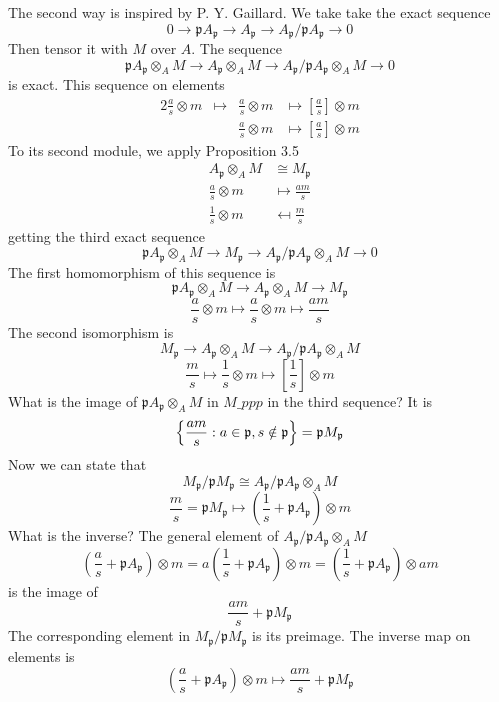 \documentclass{article}
\newcommand{\mf}{\mathfrak}
\newcommand{\ppp}{\mf p}
\begin{document}
The second way is inspired by P. Y. Gaillard.
We take take the exact sequence
\[
0 \rightarrow \ppp A_\ppp \rightarrow A_\ppp \rightarrow A_\ppp/\ppp A_\ppp \rightarrow 0
\]
Then tensor it with $M$ over $A$. The sequence
\[
\ppp A_\ppp \otimes_A M \rightarrow A_\ppp \otimes_A M \rightarrow A_\ppp / \ppp A_\ppp \otimes_A M \rightarrow 0
\]
is exact. This sequence on elements
\begin{alignat*}{2}
\frac{a}{s} \otimes m 
  & \mapsto  
  & \frac{a}{s} \otimes m 
  & \mapsto 
    \left[ \frac{a}{s} \right] \otimes m \\
&& \frac{a}{s} \otimes m  
  & \mapsto 
    \left[ \frac{a}{s} \right] \otimes m
\end{alignat*}
To its second module, we apply Proposition 3.5
\begin{align*}
A_\ppp \otimes_A M & \cong M_\ppp \\
\frac{a}{s} \otimes m & \mapsto \frac{am}{s} \\
\frac{1}{s} \otimes m & \mapsfrom \frac{m}{s}
\end{align*}
getting the third exact sequence
\[
\ppp A_\ppp \otimes_A M \rightarrow M_\ppp \rightarrow A_\ppp / \ppp A_\ppp \otimes_A M \rightarrow 0
\]
The first homomorphism of this sequence is
\[
\ppp A_\ppp \otimes_A M \rightarrow A_\ppp \otimes_A M \rightarrow M_\ppp
\]
\[
\frac{a}{s}\otimes m \mapsto \frac{a}{s}\otimes m \mapsto \frac{am}{s} 
\]
The second isomorphism is
\[
M_\ppp \rightarrow A_\ppp \otimes_A M \rightarrow A_\ppp/\ppp A_\ppp \otimes_A M
\]
\[
\frac{m}{s} \mapsto \frac{1}{s} \otimes m \mapsto \left[ \frac{1}{s} \right] \otimes m
\]
What is the image of $\ppp A_\ppp \otimes_A M$ in $M\_ppp$ in the third sequence? It is
\[
\Bigl\{ \frac{am}{s}: a \in \ppp, s \notin \ppp  \Bigr\} = \ppp M_\ppp
\]
Now we can state that
\[
M_\ppp/\ppp M_\ppp \cong A_\ppp/\ppp A_\ppp \otimes_A M
\]
\[
\frac{m}{s} = \ppp M_\ppp \mapsto \left(\frac{1}{s} + \ppp A_\ppp \right) \otimes m
\]
What is the inverse? The general element of $A_\ppp/\ppp A_\ppp \otimes_A M$ 
\[
\left( \frac{a}{s} + \ppp A_\ppp \right) \otimes m = a \left( \frac{1}{s} + \ppp A_\ppp \right) \otimes m = \left( \frac{1}{s} + \ppp A_\ppp \right) \otimes am
\]
is the image of
\[
\frac{am}{s} + \ppp M_\ppp
\]
The corresponding element in $M_\ppp/\ppp M_\ppp$ is its preimage. The inverse map on elements is
\[
\left( \frac{a}{s} + \ppp A_\ppp \right) \otimes m \mapsto \frac{am}{s} + \ppp M_\ppp
\]
\end{document}
